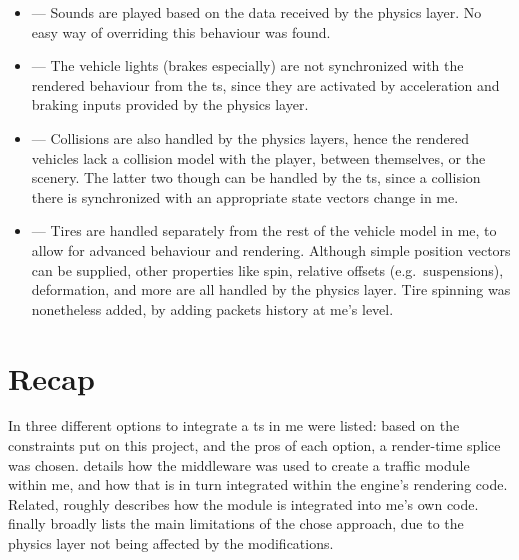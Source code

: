 \begin{itemize}
	\item {} --- Sounds are played based on the data received by the physics layer. No easy way of overriding this behaviour was found.
	\item {} --- The vehicle lights (brakes especially) are not synchronized with the rendered behaviour from the \gls{ts}, since they are activated by acceleration and braking inputs provided by the physics layer.
	\item {} --- Collisions are also handled by the physics layers, hence the rendered vehicles lack a collision model with the player, between themselves, or the scenery. The latter two though can be handled by the \gls{ts}, since a collision there is synchronized with an appropriate state vectors change in \gls{me}.
	\item {} --- Tires are handled separately from the rest of the vehicle model in \gls{me}, to allow for advanced behaviour and rendering. Although simple position vectors can be supplied, other properties like spin, relative offsets (e.g.\ suspensions), deformation, and more are all handled by the physics layer. Tire spinning was nonetheless added, by adding packets history at \gls{me}'s level.
\end{itemize}

\section{Recap}\label{sc:integration:recap}

In  three different options to integrate a \gls{ts} in \gls{me} were listed: based on the constraints put on this project, and the pros of each option, a render-time splice was chosen.  details how the \gls{middleware} was used to create a traffic module within \gls{me}, and how that is in turn integrated within the engine's rendering code. Related,  roughly describes how the module is integrated into \gls{me}'s own code.  finally broadly lists the main limitations of the chose approach, due to the physics layer not being affected by the modifications.
